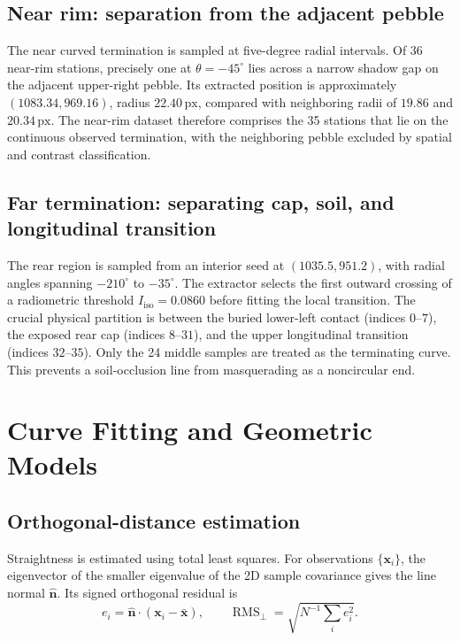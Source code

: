 \documentclass[11pt,letterpaper]{article}
\newcommand{\rms}{\operatorname{RMS}}
\newcommand{\px}{\,\mathrm{px}}
\newcommand{\mat}[1]{\mathbf{#1}}
\begin{document}
\subsection{Near rim: separation from the adjacent pebble}

The near curved termination is sampled at five-degree radial intervals. Of 36 near-rim stations, precisely one at \(\theta=-45^\circ\) lies across a narrow shadow gap on the adjacent upper-right pebble. Its extracted position is approximately \((1083.34,969.16)\), radius \(22.40\px\), compared with neighboring radii of \(19.86\) and \(20.34\px\). The near-rim dataset therefore comprises the 35 stations that lie on the continuous observed termination, with the neighboring pebble excluded by spatial and contrast classification.

\subsection{Far termination: separating cap, soil, and longitudinal transition}

The rear region is sampled from an interior seed at \((1035.5,951.2)\), with radial angles spanning \(-210^\circ\) to \(-35^\circ\). The extractor selects the first outward crossing of a radiometric threshold \(I_{\mathrm{iso}}=0.0860\) before fitting the local transition. The crucial physical partition is between the buried lower-left contact (indices \(0\)--\(7\)), the exposed rear cap (indices \(8\)--\(31\)), and the upper longitudinal transition (indices \(32\)--\(35\)). Only the 24 middle samples are treated as the terminating curve. This prevents a soil-occlusion line from masquerading as a noncircular end.

\section{Curve Fitting and Geometric Models}
\label{sec:models}

\subsection{Orthogonal-distance estimation}

Straightness is estimated using total least squares. For observations \(\{\mat x_i\}\), the eigenvector of the smaller eigenvalue of the 2D sample covariance gives the line normal \(\hat{\mat n}\). Its signed orthogonal residual is
\begin{equation}
 e_i=\hat{\mat n}\cdot(\mat x_i-\bar{\mat x}),\qquad
 \rms_{\perp}=\sqrt{N^{-1}\sum_i e_i^2}.
\end{equation}
\end{document}
